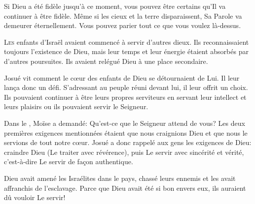 Si Dieu a été fidèle jusqu'à ce moment, vous pouvez être certains
 qu'Il va continuer à être fidèle. Même si les cieux et la terre disparaissent,
 Sa Parole va demeurer éternellement.
 Vous pouvez parier tout ce que vous voulez là-dessus. 

\dvrule







\lettrine{L}{es} enfants d'Israël avaient commencé à servir d'autres dieux.
 Ils reconnaissaient toujours l'existence de Dieu, mais leur temps
 et leur énergie étaient absorbés par d'autres poursuites.
 Ils avaient relégué Dieu à une place secondaire.

Josué vit comment le c\oe{}ur des enfants de Dieu se détournaient de Lui.
 Il leur lan\c{c}a donc un défi. S'adressant au peuple réuni devant lui,
 il leur offrit un choix. Ils pouvaient continuer à être
 leurs propres serviteurs
 \ocadr en servant leur intellect et leurs plaisirs \fcadr{}
 ou ils pouvaient servir le Seigneur.


Dans le , Moïse a demandé:
 \Og Qu'est-ce que le Seigneur attend de vous? \Fg{}
 Les deux premières exigences mentionnées
 étaient que nous craignions Dieu et que nous le servions de tout notre c\oe{}ur.
 Josué a donc rappelé aux gens les exigences de Dieu:
 craindre Dieu (Le traiter avec révérence),
 puis Le servir avec sincérité et vérité,
 c'est-à-dire Le servir de fa\c{c}on authentique.

Dieu avait amené les Israélites dans le pays,
 chassé leurs ennemis et les avait affranchis de l'esclavage.
 Parce que Dieu avait été si bon envers eux, ils auraient dû vouloir Le servir!

